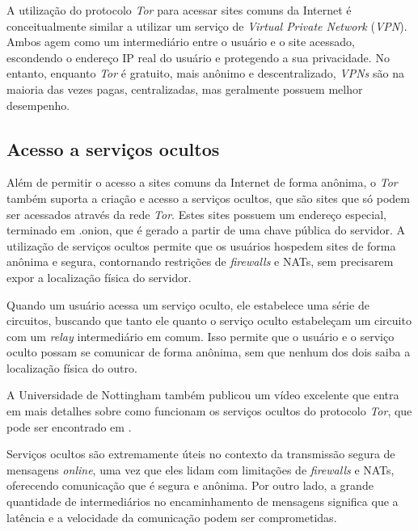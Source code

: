 A utilização do protocolo \textit{Tor} para acessar sites comuns da Internet é conceitualmente similar a utilizar um serviço de \textit{Virtual Private Network} (\textit{VPN}). Ambos agem como um intermediário entre o usuário e o site acessado, escondendo o endereço IP real do usuário e protegendo a sua privacidade. No entanto, enquanto \textit{Tor} é gratuito, mais anônimo e descentralizado, \textit{VPNs} são na maioria das vezes pagas, centralizadas, mas geralmente possuem melhor desempenho.

\subsection{Acesso a serviços ocultos}

Além de permitir o acesso a sites comuns da Internet de forma anônima, o \textit{Tor} também suporta a criação e acesso a serviços ocultos, que são sites que só podem ser acessados através da rede \textit{Tor}. Estes sites possuem um endereço especial, terminado em .onion, que é gerado a partir de uma chave pública do servidor. A utilização de serviços ocultos permite que os usuários hospedem sites de forma anônima e segura, contornando restrições de \textit{firewalls} e NATs, sem precisarem expor a localização física do servidor.

Quando um usuário acessa um serviço oculto, ele estabelece uma série de circuitos, buscando que tanto ele quanto o serviço oculto estabeleçam um circuito com um \textit{relay} intermediário em comum. Isso permite que o usuário e o serviço oculto possam se comunicar de forma anônima, sem que nenhum dos dois saiba a localização física do outro.

A Universidade de Nottingham também publicou um vídeo excelente que entra em mais detalhes sobre como funcionam os serviços ocultos do protocolo \textit{Tor}, que pode ser encontrado em \cite{computerphile-hidden-services}.

Serviços ocultos são extremamente úteis no contexto da transmissão segura de mensagens \textit{online}, uma vez que eles lidam com limitações de \textit{firewalls} e NATs, oferecendo comunicação que é segura e anônima. Por outro lado, a grande quantidade de intermediários no encaminhamento de mensagens significa que a latência e a velocidade da comunicação podem ser comprometidas.